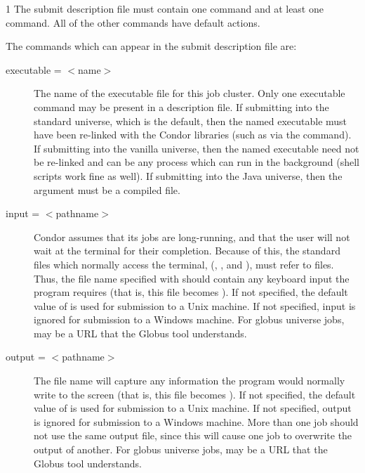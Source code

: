 \begin{ManPage}{\label{man-condor-submit}}{1}
The submit description file must contain one  command and at least one
 command.  All of the other commands have default actions.

The commands which can appear in the submit description file are:

\begin{description} 


\item[executable = $<$name$>$]
The name of the executable file for this
job cluster. Only one executable command may be present in a description
file. If submitting into the standard universe, which is the default,
then the named executable must have been re-linked with the Condor
libraries (such as via the  command). If submitting into
the vanilla universe, then the named executable need not be re-linked and
can be any process which can run in the background (shell scripts work
fine as well).  If submitting into the Java universe, then the argument
must be a compiled  file.



\item[input = $<$pathname$>$]
Condor assumes that its jobs are
long-running, and that the user will not wait at the terminal for their
completion. Because of this, the standard files which normally access
the terminal, (, , and ),
must refer to files. Thus,
the file name specified with  should contain any keyboard
input the program requires (that is, this file becomes ).
If not specified, the default value
of  is used for submission to a Unix machine.
If not specified, input is ignored
for submission to a Windows machine.
For globus universe jobs,  may be a URL that the Globus
tool  understands.


\item[output = $<$pathname$>$]
The  file name will capture
any information the program would normally write to the screen
(that is, this file becomes ).
If not specified, the default value of
 is used for submission to a Unix machine.
If not specified, output is ignored
for submission to a Windows machine.
More than one job should not use the same output
file, since this will cause one job to overwrite the output of
another.
For globus universe jobs,  may be a URL that the Globus
tool  understands.


\end{description}
\end{ManPage}
